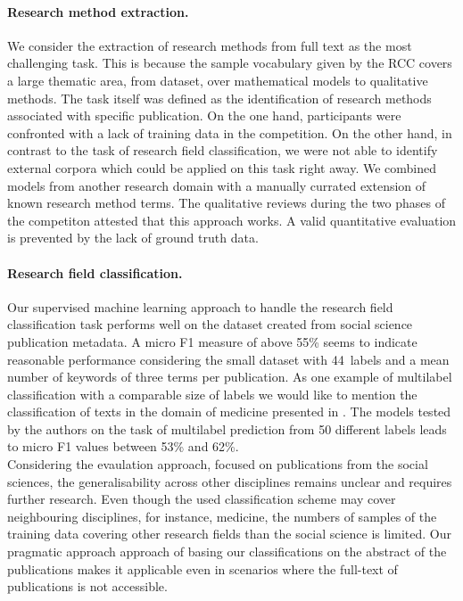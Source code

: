 \paragraph{Research method extraction.} %
We consider the extraction of research methods from full text as the most challenging task. This is because the sample vocabulary given by the RCC covers a large thematic area, from dataset, over mathematical models to qualitative methods.
The task itself was defined as the identification of research methods associated with specific publication.
On the one hand, participants were confronted with a lack of training data in the competition. On the other hand, in contrast to the task of research field classification, we were not able to identify external corpora which could be applied on this task right away.
We combined models from another research domain with a manually currated extension of known research method terms.
The qualitative reviews during the two phases of the competiton attested that this approach works.
A valid quantitative evaluation is prevented by the lack of ground truth data.

\paragraph{Research field classification.}
Our supervised machine learning approach to handle the research field classification task performs well on the dataset created from social science publication metadata. A micro F1 measure of above 55\% seems to indicate reasonable performance considering the small dataset with 44~labels and a mean number of keywords of three terms per publication.
As one example of multilabel classification with a comparable size of labels we would like to mention the classification of texts in the domain of medicine presented in \cite{wang2018joint}.
The models tested by the authors on the task of multilabel prediction from 50 different labels leads to micro F1 values between 53\% and 62\%.\\
Considering the evaulation approach, focused on publications from the social sciences, the generalisability across other disciplines remains unclear and requires further research.
Even though the used classification scheme may cover neighbouring disciplines, for instance, medicine, the numbers of samples of the training data covering other research fields than the social science is limited.
Our pragmatic approach approach of basing our classifications on the abstract of the publications makes it applicable even in scenarios where the full-text of publications is not accessible. %


